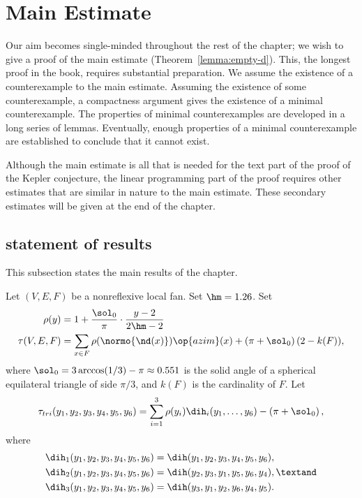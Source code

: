 \section{Main Estimate}\label{sec:weight}  

Our aim becomes single-minded throughout the rest of the chapter; we
wish to give a proof of the main estimate (Theorem~\ref{lemma:empty-d}).
This,  the longest proof in the book,  requires substantial
preparation.  We  assume the existence of a counterexample to the
main estimate.  Assuming the existence of some counterexample, a
compactness argument gives the existence of a minimal counterexample.
The properties of minimal counterexamples are developed in a long
series of lemmas.  Eventually, enough properties of a minimal
counterexample are established to conclude that it cannot exist.

Although the main estimate is all that is needed for the text part of
the proof of the Kepler conjecture, the linear programming part of the
proof requires other estimates that are similar in nature to the
main estimate.  These secondary estimates will be given at the end of the chapter.

\subsection{statement of results}\label{sec:statement}

This subsection states the main results of the chapter.

\begin{definition}\label{def:tau}
Let $(V,E,F)$ be a nonreflexive local fan.  Set $\hm = 1.26$.  Set
\begin{align*}
\rho(y) &= 1 + \dfrac{\sol_0}{\pi} \cdot
    \dfrac{y-2}{2\hm-2} \\
  \tau(V,E,F) &=\sum_{x\in F} \rho(\normo{\nd(x)})\op{azim}(x)
+ \left(\pi+{\sol_0}\right) (2- k(F)),
\end{align*}
where $\sol_0=3\arccos(1/3)-\pi\approx0.551$ is the solid angle of a
spherical equilateral triangle of side $\pi/3$, and $k(F)$ is the
cardinality of $F$.  
Let 
\begin{equation}\label{eqn:tautri}
  \tau_{tri}(y_1,y_2,y_3,y_4,y_5,y_6) =
  \sum_{i=1}^3 \rho(y_i) \dih_i(y_1,\ldots,y_6)
- \left(\pi+{\sol_0}\right),
\end{equation}
where
\begin{align}\label{eqn:dihi}
\dih_1(y_1,y_2,y_3,y_4,y_5,y_6) &= \dih(y_1,y_2,y_3,y_4,y_5,y_6),\notag\\
\dih_2(y_1,y_2,y_3,y_4,y_5,y_6) &= \dih(y_2,y_3,y_1,y_5,y_6,y_4),\textand\notag \\
\dih_3(y_1,y_2,y_3,y_4,y_5,y_6) &= \dih(y_3,y_1,y_2,y_6,y_4,y_5).
\end{align}
\end{definition}


